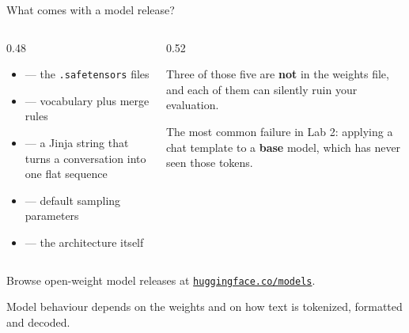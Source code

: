 \documentclass[aspectratio=169,10pt]{beamer}
\begin{document}
\begin{frame}{What comes with a model release?}
  \begin{columns}[T]
    \begin{column}{0.48\textwidth}
      \begin{itemize}
        \item {} --- the \texttt{.safetensors} files
        \item {} --- vocabulary plus merge rules
        \item {} --- a Jinja string that turns a conversation
              into one flat sequence
        \item {} --- default sampling parameters
        \item {} --- the architecture itself
      \end{itemize}
    \end{column}
    \begin{column}{0.52\textwidth}
      \begin{gotcha}
        Three of those five are \textbf{not} in the weights file, and each of
        them can silently ruin your evaluation.
        \vspace{0.3em}

        The most common failure in Lab 2: applying a chat template to a
        \textbf{base} model, which has never seen those tokens.
      \end{gotcha}
    \end{column}
  \end{columns}
  \vspace{0.3em}
  \small
  Browse open-weight model releases at
  \href{https://huggingface.co/models}{\texttt{huggingface.co/models}}.
  \vfill
  \begin{takeaway}
    Model behaviour depends on the weights and on how text is tokenized,
    formatted and decoded.
  \end{takeaway}
\end{frame}
\end{document}
